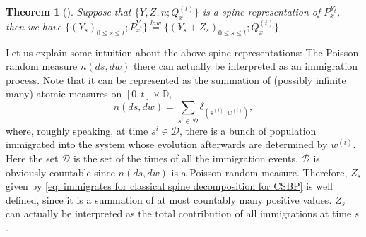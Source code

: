 \documentclass[UTF8]{pkuthss}
\theoremstyle{plain}
\newtheorem{thm}{Theorem}[section]
\theoremstyle{definition}
\numberwithin{equation}{section}
\begin{document}
\begin{thm}[\cite{EckhoffKyprianouWinkel2015Spines,EnglanderKyprianou2004Local,LiuRenSong2009Log}]
\label{thm: spine decomposition for CSBP}
	Suppose that $\{Y, Z, n; Q_x^{(t)}\}$ is a spine representation of $P_x^{Y_t}$, then we have $\{(Y_s)_{0\leq s\leq t};P_x^{Y_t}\}\overset{law}{=} \{(Y_s+Z_s)_{0\leq s\leq t}; Q_x^{(t)}\}$. 
\end{thm}

	Let us explain some intuition about the above spine representations: The Poisson random measure $n(ds,dw)$ there can actually be interpreted as an immigration process. Note that it can be represented as the summation of (possibly infinite many) atomic measures on $[0,t]\times \mathbb D$,
\[
	n(ds,dw) = \sum_{s^{i}\in \mathcal D} \delta_{(s^{(i)},w^{(i)})},
\]
	where, roughly speaking, at time $s^{i}\in \mathcal D$, there is a bunch of population immigrated into the system whose evolution afterwards are determined by $w^{(i)}$. 
	Here the set $\mathcal D$ is the set of the times of all the immigration events. 
	$\mathcal D$ is obviously countable since $n(ds,dw)$ is a Poisson random measure. 
	Therefore, $Z_s$ given by \eqref{eq: immigrates for classical spine decomposition for CSBP} is well defined, since it is a summation of at most countably many positive values. 
	$Z_s$ can actually be interpreted as the total contribution of all immigrations at time $s$.
\end{document}
